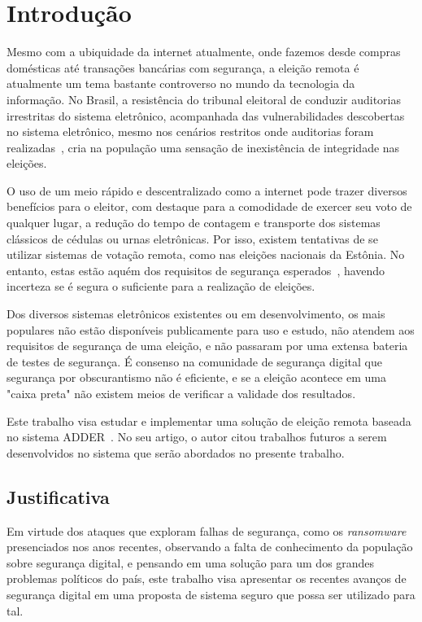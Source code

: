 

\chapter{Introdução}

Mesmo com a ubiquidade da internet atualmente, onde fazemos desde compras
domésticas até transações bancárias com segurança, a eleição remota é
atualmente um tema bastante controverso no mundo da tecnologia da informação.
No Brasil, a resistência do tribunal eleitoral de conduzir auditorias
irrestritas do sistema eletrônico, acompanhada das vulnerabilidades descobertas
no sistema eletrônico, mesmo nos cenários restritos onde auditorias foram
realizadas~\cite{aranha2012vulnerabilidades}, cria na população uma sensação de
inexistência de integridade nas eleições.

O uso de um meio rápido e descentralizado como a internet pode trazer diversos
benefícios para o eleitor, com destaque para a comodidade de exercer seu voto
de qualquer lugar, a redução do tempo de contagem e transporte dos sistemas
clássicos de cédulas ou urnas eletrônicas. Por isso, existem tentativas de se
utilizar sistemas de votação remota, como nas eleições nacionais da Estônia. No
entanto, estas estão aquém dos requisitos de segurança
esperados~\cite{Springall:2014:SAE:2660267.2660315}, havendo incerteza se é
segura o suficiente para a realização de eleições.

Dos diversos sistemas eletrônicos existentes ou em desenvolvimento, os mais
populares não estão disponíveis publicamente para uso e estudo, não atendem aos
requisitos de segurança de uma eleição, e não passaram por uma extensa bateria
de testes de segurança. É consenso na comunidade de segurança digital que
segurança por obscurantismo não é eficiente, e se a eleição acontece em uma
"caixa preta" não existem meios de verificar a validade dos resultados.

Este trabalho visa estudar e implementar uma solução de eleição remota baseada
no sistema ADDER~\cite{kiayias2006internet}. No seu artigo, o autor citou
trabalhos futuros a serem desenvolvidos no sistema que serão abordados no
presente trabalho.

\section{Justificativa}

Em virtude dos ataques que exploram falhas de segurança, como os
\textit{ransomware} presenciados nos anos recentes, observando a falta de
conhecimento da população sobre segurança digital, e pensando em uma solução
para um dos grandes problemas políticos do país, este trabalho visa apresentar
os recentes avanços de segurança digital em uma proposta de sistema seguro que
possa ser utilizado para tal.

